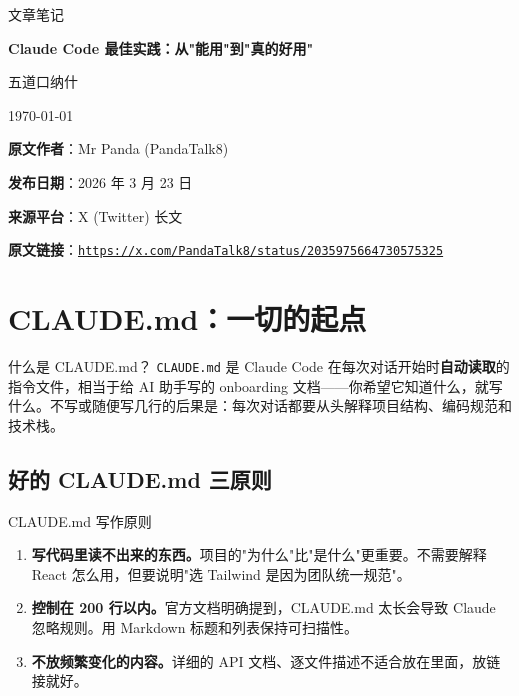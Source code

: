 \documentclass[a4paper]{article}
\newcommand{\notetitle}{Claude Code 最佳实践：从"能用"到"真的好用"}
\newcommand{\noteauthors}{五道口纳什}
\newcommand{\notedate}{\today}
\newcommand{\articleauthor}{Mr Panda (PandaTalk8)}
\newcommand{\articlepublishdate}{2026 年 3 月 23 日}
\newcommand{\articleurl}{https://x.com/PandaTalk8/status/2035975664730575325}
\begin{document}
\begin{titlepage}
\centering
{\Large 文章笔记\par}
\vspace{1.2cm}
{\huge\bfseries \notetitle\par}
\vspace{0.8cm}
{\large \noteauthors\par}
\vspace{0.3cm}
{\large \notedate\par}
\vfill
\begin{tcolorbox}[width=0.9\textwidth, colback=black!2!white, colframe=black!60, sharp corners]
\textbf{原文作者}：\articleauthor\par
\textbf{发布日期}：\articlepublishdate\par
\textbf{来源平台}：X (Twitter) 长文\par
\textbf{原文链接}：\href{\articleurl}{\nolinkurl{\articleurl}}
\end{tcolorbox}
\end{titlepage}

\tableofcontents
\newpage


\section{CLAUDE.md：一切的起点}

\begin{knowledgebox}{什么是 CLAUDE.md？}
\texttt{CLAUDE.md} 是 Claude Code 在每次对话开始时\textbf{自动读取}的指令文件，相当于给 AI 助手写的 onboarding 文档——你希望它知道什么，就写什么。不写或随便写几行的后果是：每次对话都要从头解释项目结构、编码规范和技术栈。
\end{knowledgebox}

\subsection{好的 CLAUDE.md 三原则}

\begin{importantbox}{CLAUDE.md 写作原则}
\begin{enumerate}[leftmargin=1.5em]
  \item \textbf{写代码里读不出来的东西。}项目的"为什么"比"是什么"更重要。不需要解释 React 怎么用，但要说明"选 Tailwind 是因为团队统一规范"。
  \item \textbf{控制在 200 行以内。}官方文档明确提到，CLAUDE.md 太长会导致 Claude 忽略规则。用 Markdown 标题和列表保持可扫描性。
  \item \textbf{不放频繁变化的内容。}详细的 API 文档、逐文件描述不适合放在里面，放链接就好。
\end{enumerate}
\end{importantbox}
\end{document}
